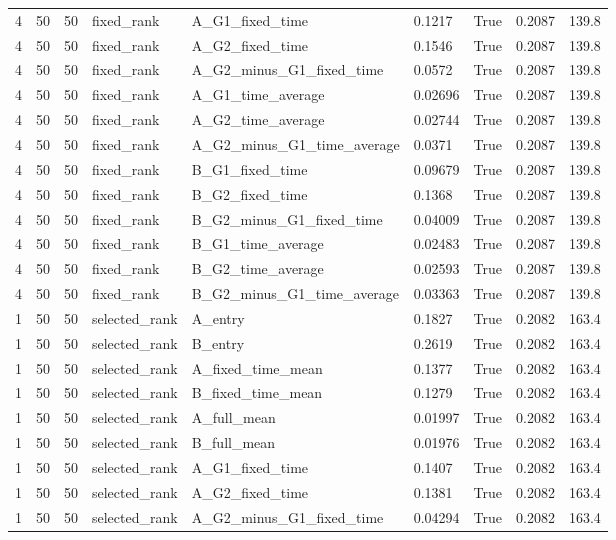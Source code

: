 \begin{longtable}{lllllllll}
4 & 50 & 50 & fixed\_rank & A\_G1\_fixed\_time & 0.1217 & True & 0.2087 & 139.8 \\
4 & 50 & 50 & fixed\_rank & A\_G2\_fixed\_time & 0.1546 & True & 0.2087 & 139.8 \\
4 & 50 & 50 & fixed\_rank & A\_G2\_minus\_G1\_fixed\_time & 0.0572 & True & 0.2087 & 139.8 \\
4 & 50 & 50 & fixed\_rank & A\_G1\_time\_average & 0.02696 & True & 0.2087 & 139.8 \\
4 & 50 & 50 & fixed\_rank & A\_G2\_time\_average & 0.02744 & True & 0.2087 & 139.8 \\
4 & 50 & 50 & fixed\_rank & A\_G2\_minus\_G1\_time\_average & 0.0371 & True & 0.2087 & 139.8 \\
4 & 50 & 50 & fixed\_rank & B\_G1\_fixed\_time & 0.09679 & True & 0.2087 & 139.8 \\
4 & 50 & 50 & fixed\_rank & B\_G2\_fixed\_time & 0.1368 & True & 0.2087 & 139.8 \\
4 & 50 & 50 & fixed\_rank & B\_G2\_minus\_G1\_fixed\_time & 0.04009 & True & 0.2087 & 139.8 \\
4 & 50 & 50 & fixed\_rank & B\_G1\_time\_average & 0.02483 & True & 0.2087 & 139.8 \\
4 & 50 & 50 & fixed\_rank & B\_G2\_time\_average & 0.02593 & True & 0.2087 & 139.8 \\
4 & 50 & 50 & fixed\_rank & B\_G2\_minus\_G1\_time\_average & 0.03363 & True & 0.2087 & 139.8 \\
1 & 50 & 50 & selected\_rank & A\_entry & 0.1827 & True & 0.2082 & 163.4 \\
1 & 50 & 50 & selected\_rank & B\_entry & 0.2619 & True & 0.2082 & 163.4 \\
1 & 50 & 50 & selected\_rank & A\_fixed\_time\_mean & 0.1377 & True & 0.2082 & 163.4 \\
1 & 50 & 50 & selected\_rank & B\_fixed\_time\_mean & 0.1279 & True & 0.2082 & 163.4 \\
1 & 50 & 50 & selected\_rank & A\_full\_mean & 0.01997 & True & 0.2082 & 163.4 \\
1 & 50 & 50 & selected\_rank & B\_full\_mean & 0.01976 & True & 0.2082 & 163.4 \\
1 & 50 & 50 & selected\_rank & A\_G1\_fixed\_time & 0.1407 & True & 0.2082 & 163.4 \\
1 & 50 & 50 & selected\_rank & A\_G2\_fixed\_time & 0.1381 & True & 0.2082 & 163.4 \\
1 & 50 & 50 & selected\_rank & A\_G2\_minus\_G1\_fixed\_time & 0.04294 & True & 0.2082 & 163.4 \\

\end{longtable}
